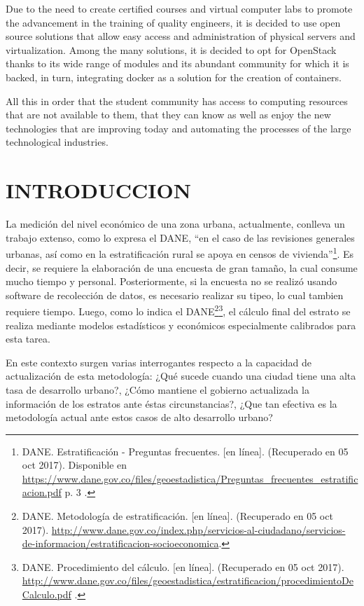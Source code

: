     Due to the need to create certified courses and virtual computer labs to promote the advancement in the training of quality engineers, it is decided to use open source solutions that allow easy access and administration of physical servers and virtualization. Among the many solutions, it is decided to opt for OpenStack thanks to its wide range of modules and its abundant community for which it is backed, in turn, integrating docker as a solution for the creation of containers.
    
    All this in order that the student community has access to computing resources that are not available to them, that they can know as well as enjoy the new technologies that are improving today and automating the processes of the large technological industries.
    
    
	\newpage\chapter*{INTRODUCCION}
    La medición del nivel económico de una zona urbana, actualmente, conlleva un trabajo extenso, como lo expresa el DANE, “en el caso de las revisiones generales urbanas, así como en la estratificación rural se apoya en censos de vivienda”\footnote{DANE. Estratificación - Preguntas frecuentes. [en línea]. (Recuperado en 05 oct 2017). Disponible en \url{https://www.dane.gov.co/files/geoestadistica/Preguntas_frecuentes_estratificacion.pdf} p. 3 .}. Es decir, se requiere la elaboración de una encuesta de gran tamaño, la cual consume mucho tiempo y personal. Posteriormente, si la encuesta no se realizó usando software de recolección de datos, es necesario realizar su tipeo, lo cual tambien requiere tiempo. Luego, como lo indica el DANE\footnote{DANE. Metodología de estratificación. [en línea]. (Recuperado en 05 oct 2017). \url{http://www.dane.gov.co/index.php/servicios-al-ciudadano/servicios-de-informacion/estratificacion-socioeconomica}.}\footnote{DANE. Procedimiento del cálculo. [en línea]. (Recuperado en 05 oct 2017). \url{http://www.dane.gov.co/files/geoestadistica/estratificacion/procedimientoDeCalculo.pdf} .}, el cálculo final del estrato se realiza mediante modelos estadísticos y económicos especialmente calibrados para esta tarea.
    
    En este contexto surgen varias interrogantes respecto a la capacidad de actualización de esta metodología: ¿Qué sucede cuando una ciudad tiene una alta tasa de desarrollo urbano?, ¿Cómo mantiene el gobierno actualizada la información de los estratos ante éstas circunstancias?, ¿Que tan efectiva es la metodología actual ante estos casos de alto desarrollo urbano?
    
